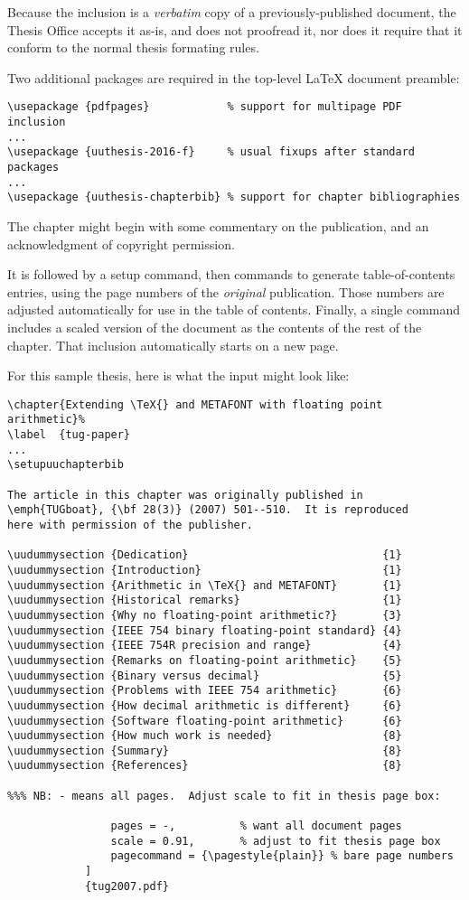 Because the inclusion is a \emph{verbatim} copy of a
previously-published document, the Thesis Office accepts it
as-is, and does not proofread it, nor does it require that
it conform to the normal thesis formating rules.

Two additional packages are required in the top-level
\LaTeX{} document preamble:
%
\begin{verbatim}
\usepackage {pdfpages}            % support for multipage PDF inclusion
...
\usepackage {uuthesis-2016-f}     % usual fixups after standard packages
...
\usepackage {uuthesis-chapterbib} % support for chapter bibliographies
\end{verbatim}

The chapter might begin with some commentary on the
publication, and an acknowledgment of copyright permission.

It is followed by a setup command, then commands to generate
table-of-contents entries, using the page numbers of the
\emph{original} publication.  Those numbers are adjusted
automatically for use in the table of contents.  Finally, a
single command includes a scaled version of the document as
the contents of the rest of the chapter.  That inclusion
automatically starts on a new page.

For this sample thesis, here is what the input might look
like:
%
\begin{verbatim}
\chapter{Extending \TeX{} and METAFONT with floating point arithmetic}%
\label  {tug-paper}
...
\setupuuchapterbib

The article in this chapter was originally published in
\emph{TUGboat}, {\bf 28(3)} (2007) 501--510.  It is reproduced
here with permission of the publisher.

\uudummysection {Dedication}                              {1}
\uudummysection {Introduction}                            {1}
\uudummysection {Arithmetic in \TeX{} and METAFONT}       {1}
\uudummysection {Historical remarks}                      {1}
\uudummysection {Why no floating-point arithmetic?}       {3}
\uudummysection {IEEE 754 binary floating-point standard} {4}
\uudummysection {IEEE 754R precision and range}           {4}
\uudummysection {Remarks on floating-point arithmetic}    {5}
\uudummysection {Binary versus decimal}                   {5}
\uudummysection {Problems with IEEE 754 arithmetic}       {6}
\uudummysection {How decimal arithmetic is different}     {6}
\uudummysection {Software floating-point arithmetic}      {6}
\uudummysection {How much work is needed}                 {8}
\uudummysection {Summary}                                 {8}
\uudummysection {References}                              {8}

%%% NB: - means all pages.  Adjust scale to fit in thesis page box:

                pages = -,          % want all document pages
                scale = 0.91,       % adjust to fit thesis page box
                pagecommand = {\pagestyle{plain}} % bare page numbers
            ]
            {tug2007.pdf}
\end{verbatim}
%

